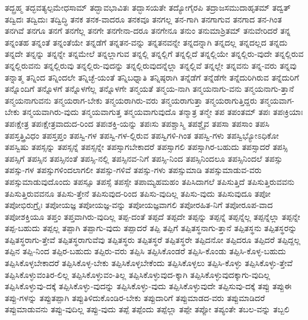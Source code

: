 {ತದ್ಬ್ರಹ್ಮ
ತದ್ಭವತ್ಯಲ್ಪಮೇಧಸಾಮ್
ತದ್ಭಾವಭಾವಿತಃ
ತದ್ಭಾಸಯತೇ
ತದ್ಯೋಗೈರಪಿ
ತದ್ರಾಜಸಮುದಾಹೃತಮ್
ತದ್ವತ್
ತದ್ವಿದಃ
ತದ್ವಿದುಃ
ತದ್ವಿದ್ಧಿ
ತನಕ
ತನಕ-ವಾದರೂ
ತನಕವೂ
ತನಗಲ್ಲ
ತನ-ಗಾಗಿ
ತನಗಾಗುವ
ತನಗಾದ
ತನ-ಗಿಂತ
ತನಗಿವೆ
ತನಗೂ
ತನಗೆ
ತನಗೆಲ್ಲ
ತನಗೇ
ತನಗೇನಾ-ದರೂ
ತನಗೇನೂ
ತನುಂ
ತನುಮಾಶ್ರಿತಮ್
ತನುವೇರಿದರೆ
ತನ್ನ
ತನ್ನಂತಹ
ತನ್ನಂತೆ
ತನ್ನಂತೆಯೇ
ತನ್ನಡೆಗೆ
ತನ್ನತನ-ವನ್ನು
ತನ್ನತನವನ್ನೇ
ತನ್ನದನ್ನಾಗಿ
ತನ್ನದಲ್ಲ
ತನ್ನದಲ್ಲದ
ತನ್ನದು
ತನ್ನದೇ
ತನ್ನನ್ನು
ತನ್ನನ್ನೇ
ತನ್ನಮೇಲೆ
ತನ್ನಲ್ಲಾಗುವ
ತನ್ನಲ್ಲಿ
ತನ್ನಲ್ಲಿಗೆ
ತನ್ನಲ್ಲಿದೆ
ತನ್ನಲ್ಲಿಯೇ
ತನ್ನಲ್ಲಿರು-ವುದೇ
ತನ್ನಲ್ಲಿರುವ
ತನ್ನಲ್ಲಿರುವನು
ತನ್ನಲ್ಲಿರುವು
ತನ್ನಲ್ಲಿರು-ವುದನ್ನು
ತನ್ನಲ್ಲಿರುವುದನ್ನೆಲ್ಲಾ
ತನ್ನಲ್ಲಿವೆ
ತನ್ನಲ್ಲೇ
ತನ್ನವನು
ತನ್ನ-ವರು
ತನ್ನವು
ತನ್ನಾತ್ಮ
ತನ್ನಿಂದ
ತನ್ನಿಂದಲೇ
ತನ್ನಿಚ್ಛೆ-ಯಂತೆ
ತನ್ನಿಬಧ್ನಾತಿ
ತನ್ನಿಷ್ಠರಾಗಿ
ತನ್ನೆಡೆಗೆ
ತನ್ನೆಡೆಗೇ
ತನ್ನೆದುರಿಗಿರುವ
ತನ್ನೆದುರಿಗೆ
ತನ್ನೊಂದಿಗೆ
ತನ್ನೊಳಗೆ
ತನ್ನೊಳಗೆಲ್ಲ
ತನ್ನೊಳಗೇ
ತನ್ಮಯತೆ
ತನ್ಮಯ-ನಾಗಿ
ತನ್ಮಯನಾಗು-ವನು
ತನ್ಮಯನಾಗು-ತ್ತಾನೆ
ತನ್ಮಯನಾಗುವನು
ತನ್ಮಯರಾಗ-ಬೇಕು
ತನ್ಮಯರಾಗಿರು-ವರು
ತನ್ಮಯರಾಗುತ್ತಾ
ತನ್ಮಯರಾಗುತ್ತಿದ್ದರು
ತನ್ಮಯವಾಗ-ಬೇಕು
ತನ್ಮಯವಾಗಿರು-ವುದು
ತನ್ಮಯವಾಗುತ್ತ
ತನ್ಮಯವಾಗುವುದೊ
ತನ್ಮಾತ್ರ
ತನ್ಮೇ
ತಪ
ತಪಂತಮ್
ತಪಃ
ತಪಃಕ್ರಿಯಾಃ
ತಪಃಕ್ಷೇತ್ರ
ತಪಃಕ್ಷೇತ್ರವಾದುದ-ರಿಂದ
ತಪಃಶಕ್ತಿ-ಯನ್ನು
ತಪಃಸು
ತಪಶ್ಚಾಸ್ಮಿ
ತಪಶ್ಚೈವ
ತಪಸಾ
ತಪಸಾಂ
ತಪಸಿ
ತಪಸ್ತತ್ತ್ರಿವಿಧಂ
ತಪಸ್ತಪ್ತಂ
ತಪಸ್ವಿ-ಗಳ
ತಪಸ್ವಿ-ಗಳ-ಲ್ಲಿರುವ
ತಪಸ್ವಿಗಳಿ-ಗಿಂತ
ತಪಸ್ವಿ-ಗಳು
ತಪಸ್ವಿಭ್ಯೋಽಧಿಕೋ
ತಪಸ್ವಿಷು
ತಪಸ್ಸನ್ನು
ತಪಸ್ಸನ್ನೆ
ತಪಸ್ಸನ್ನೇ
ತಪಸ್ಸಾಗಬೇಕಾದರೆ
ತಪಸ್ಸಾಗಲಿ
ತಪಸ್ಸಾಗಿರ-ಬಹುದು
ತಪಸ್ಸಾದರೆ
ತಪಸ್ಸಿ
ತಪಸ್ಸಿಗೆ
ತಪಸ್ಸಿನ
ತಪಸ್ಸಿನಂತೆ
ತಪಸ್ಸಿ-ನಲ್ಲಿ
ತಪಸ್ಸಿನವ-ನಿಗೆ
ತಪಸ್ಸಿ-ನಿಂದ
ತಪಸ್ಸಿನಿಂದಲೂ
ತಪಸ್ಸಿನಿಂದಲೆ
ತಪಸ್ಸು
ತಪಸ್ಸು-ಗಳ
ತಪಸ್ಸುಗಳಿಂದಲಾಗಲೀ
ತಪಸ್ಸು-ಗಳಿವೆ
ತಪಸ್ಸು-ಗಳು
ತಪಸ್ಸುಮಾಡಿ
ತಪಸ್ಸುಮಾಡುವ-ವರು
ತಪಸ್ಸುಮಾಡುವುದೊಂದು
ತಪಸ್ಸೂ
ತಪಸ್ಸೆ
ತಪಸ್ಸೇ
ತಪಾಮ್ಯಹಮಹಂ
ತಪಿಸಿದಾಗಲೆ
ತಪಿಸುತ್ತಿದೆ
ತಪಿಸುತ್ತಿರುವವನು
ತಪಿಸುತ್ತಿರುವವನೂ
ತಪಿಸು-ತ್ತೇನೆ
ತಪಿಸುವುದ-ರಿಂದ
ತಪಿಸು-ವುದಿಲ್ಲ
ತಪಿಸು-ವುದು
ತಪಿಸುವುದೂ
ತಪೋ
ತಪೋಭಿರುಗ್ರೈಃ
ತಪೋಯಜ್ಞ
ತಪೋಯಜ್ಞ-ವನ್ನು
ತಪೋಯಜ್ಞವಾಗಲಿ
ತಪೋರಹಿತ-ನಿಗೆ
ತಪೋರೂಪ-ವಾದ
ತಪೋಶಕ್ತಿಯೂ
ತಪ್ತಂ
ತಪ್ತವಾಗಿರು-ವುದಿಲ್ಲ
ತಪ್ಪ-ದಂತೆ
ತಪ್ಪದೆ
ತಪ್ಪದೇ
ತಪ್ಪನ್ನು
ತಪ್ಪನ್ನೆ
ತಪ್ಪನ್ನೆಲ್ಲ
ತಪ್ಪನ್ನೆಲ್ಲಾ
ತಪ್ಪನ್ನೇ
ತಪ್ಪ-ಬಹುದು
ತಪ್ಪಲ್ಲ
ತಪ್ಪಾಗಿ
ತಪ್ಪಾಗು-ವುದು
ತಪ್ಪಾದರೆ
ತಪ್ಪಿ
ತಪ್ಪಿಗೆ
ತಪ್ಪಿತಸ್ಥನಾಗು-ತ್ತಾನೆ
ತಪ್ಪಿತಸ್ಥನು
ತಪ್ಪಿತಸ್ಥರನ್ನು
ತಪ್ಪಿತಸ್ಥರಾಗು-ತ್ತೇವೆ
ತಪ್ಪಿತಸ್ಥರಾಗುವೆವು
ತಪ್ಪಿತಸ್ಥರು
ತಪ್ಪಿತಸ್ಥರೆ
ತಪ್ಪಿತಸ್ಥರೇ
ತಪ್ಪಿದನೋ
ತಪ್ಪಿದರೂ
ತಪ್ಪಿದರೆ
ತಪ್ಪಿದ್ದಲ್ಲ
ತಪ್ಪಿನ
ತಪ್ಪಿ-ನಿಂದ
ತಪ್ಪಿರ-ಬಹುದು
ತಪ್ಪಿರು-ವರು
ತಪ್ಪಿಸಿ
ತಪ್ಪಿಸಿಕೊಂಡರೆ
ತಪ್ಪಿಸಿ-ಕೊಂಡು
ತಪ್ಪಿಸಿ-ಕೊಳ್ಳ-ಬಹುದು
ತಪ್ಪಿಸಿಕೊಳ್ಳಬೇಕಾದರೆ
ತಪ್ಪಿಸಿಕೊಳ್ಳ-ಬೇಕು
ತಪ್ಪಿಸಿಕೊಳ್ಳಬೇಕೆಂದು
ತಪ್ಪಿಸಿಕೊಳ್ಳಲು
ತಪ್ಪಿಸಿ-ಕೊಳ್ಳು
ತಪ್ಪಿಸಿಕೊಳ್ಳು-ತ್ತೇವೆ
ತಪ್ಪಿಸಿಕೊಳ್ಳುವಂತಿರ-ಲಿಲ್ಲ
ತಪ್ಪಿಸಿಕೊಳ್ಳುವಂ-ತಿಲ್ಲ
ತಪ್ಪಿಸಿಕೊಳ್ಳುವುದ-ಕ್ಕಾಗಿ
ತಪ್ಪಿಸಿಕೊಳ್ಳುವುದಕ್ಕಾಗು-ವುದಿಲ್ಲ
ತಪ್ಪಿಸಿಕೊಳ್ಳುವು-ದಕ್ಕೆ
ತಪ್ಪಿಸಿಕೊಳ್ಳು-ವುದನ್ನು
ತಪ್ಪಿಸಿಕೊಳ್ಳು-ವುದು
ತಪ್ಪಿಸಿಕೊಳ್ಳುವುದೇ
ತಪ್ಪಿಸುವು-ದಕ್ಕೆ
ತಪ್ಪು
ತಪ್ಪುಈ
ತಪ್ಪು-ಗಳನ್ನು
ತಪ್ಪುತಪ್ಪಾಗಿ
ತಪ್ಪುತಿಳಿದುಕೊಂಡಿರ-ಬೇಕು
ತಪ್ಪುದಾರಿಗೆ
ತಪ್ಪುಮಾಡದ-ವರು
ತಪ್ಪುಮಾಡಿದರೆ
ತಪ್ಪುಮಾಡುವನು
ತಪ್ಪು-ವುದಿಲ್ಲ
ತಪ್ಪು-ವುದು
ತಪ್ಪೆ
ತಪ್ಪೆಂದು
ತಪ್ಪೆಲ್ಲಾ
ತಪ್ಪೇ
ತಪ್ಪೋ
ತಪ್ಯಂತೇ
ತಬಲ-ವನ್ನು
ತಬ್ಬಲಿ
}
